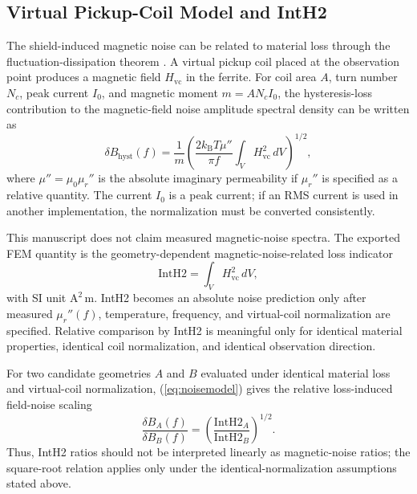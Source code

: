 ﻿\documentclass[letterpaper,journal]{IEEEtran}
\begin{document}
\subsection{Virtual Pickup-Coil Model and IntH2}

The shield-induced magnetic noise can be related to material loss through the fluctuation-dissipation theorem \cite{ref9,ref18}. A virtual pickup coil placed at the observation point produces a magnetic field $H_{\mathrm{vc}}$ in the ferrite. For coil area $A$, turn number $N_c$, peak current $I_0$, and magnetic moment $m=AN_cI_0$, the hysteresis-loss contribution to the magnetic-field noise amplitude spectral density can be written as
\begin{equation}
\delta B_{\mathrm{hyst}}(f)=
\frac{1}{m}
\left(
\frac{2k_{\mathrm{B}}T\mu''}{\pi f}
\int_V H_{\mathrm{vc}}^2\,dV
\right)^{1/2},
\label{eq:noisemodel}
\end{equation}
where $\mu''=\mu_0\mu_r''$ is the absolute imaginary permeability if $\mu_r''$ is specified as a relative quantity. The current $I_0$ is a peak current; if an RMS current is used in another implementation, the normalization must be converted consistently.

This manuscript does not claim measured magnetic-noise spectra. The exported FEM quantity is the geometry-dependent magnetic-noise-related loss indicator
\begin{equation}
\mathrm{IntH2}=\int_V H_{\mathrm{vc}}^2\,dV,
\label{eq:inth2}
\end{equation}
with SI unit $\mathrm{A^2\,m}$. IntH2 becomes an absolute noise prediction only after measured $\mu_r''(f)$, temperature, frequency, and virtual-coil normalization are specified. Relative comparison by IntH2 is meaningful only for identical material properties, identical coil normalization, and identical observation direction.

For two candidate geometries $A$ and $B$ evaluated under identical material loss and virtual-coil normalization, (\ref{eq:noisemodel}) gives the relative loss-induced field-noise scaling
\begin{equation}
\frac{\delta B_A(f)}{\delta B_B(f)}
=
\left(
\frac{\mathrm{IntH2}_A}{\mathrm{IntH2}_B}
\right)^{1/2}.
\label{eq:relnoise}
\end{equation}
Thus, IntH2 ratios should not be interpreted linearly as magnetic-noise ratios; the square-root relation applies only under the identical-normalization assumptions stated above.
\end{document}
